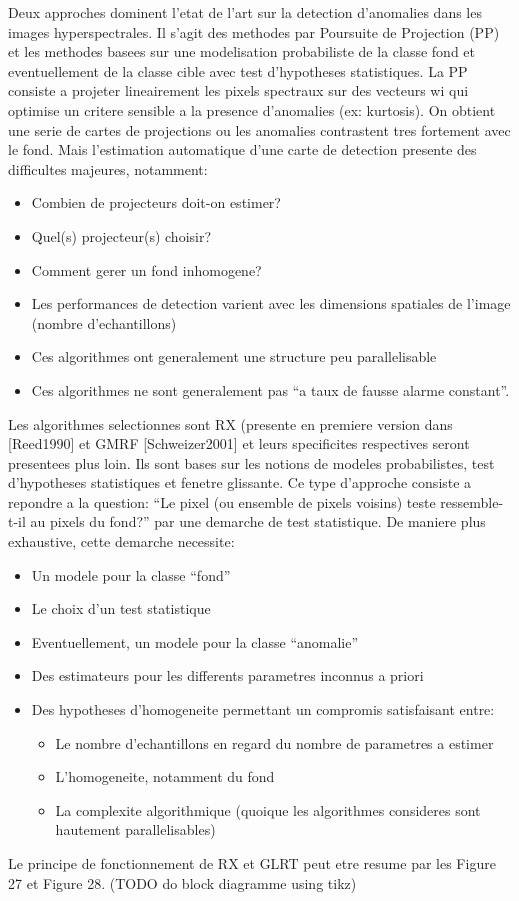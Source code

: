 Deux approches dominent l'etat de l'art sur la detection d'anomalies
dans les images hyperspectrales. Il s'agit des methodes par Poursuite
de Projection (PP) et les methodes basees sur une modelisation
probabiliste de la classe fond et eventuellement de la classe cible
avec test d'hypotheses statistiques.
La PP consiste a projeter lineairement les pixels spectraux sur des
vecteurs wi qui optimise un critere sensible a la presence d'anomalies
(ex: kurtosis). On obtient une serie de cartes de projections ou les
anomalies contrastent tres fortement avec le fond. Mais l'estimation
automatique d'une carte de detection presente des difficultes
majeures, notamment:
\begin{itemize} 
\item Combien de projecteurs doit-on estimer?  
\item Quel(s) projecteur(s) choisir?  
\item Comment gerer un fond inhomogene?  
\item Les performances de detection varient avec les dimensions spatiales de l'image (nombre d'echantillons) 
\item Ces algorithmes ont generalement une structure peu parallelisable
\item Ces algorithmes ne sont generalement pas ``a taux de fausse alarme constant''.
\end{itemize}

Les algorithmes selectionnes sont RX (presente en premiere version
dans [Reed1990] et GMRF [Schweizer2001] et leurs specificites
respectives seront presentees plus loin. Ils sont bases sur les
notions de modeles probabilistes, test d'hypotheses statistiques et
fenetre glissante.  Ce type d'approche consiste a repondre a la
question: ``Le pixel (ou ensemble de pixels voisins) teste
ressemble-t-il au pixels du fond?'' par une demarche de test
statistique. De maniere plus exhaustive, cette demarche necessite:
\begin{itemize} 
\item Un modele pour la classe ``fond'' 
\item Le choix d'un test statistique 
\item Eventuellement, un modele pour la classe ``anomalie''
\item Des estimateurs pour les differents parametres inconnus a priori
\item Des hypotheses d'homogeneite permettant un compromis satisfaisant entre: 
\begin{itemize} 
\item Le nombre d'echantillons en regard du nombre de parametres a
  estimer 
\item L'homogeneite, notamment du fond 
\item La complexite algorithmique (quoique les algorithmes consideres sont
hautement parallelisables)
\end{itemize} 
\end{itemize} 
Le principe de fonctionnement de RX et GLRT peut etre resume par les
Figure 27  et Figure 28.
(TODO do block diagramme using tikz)

